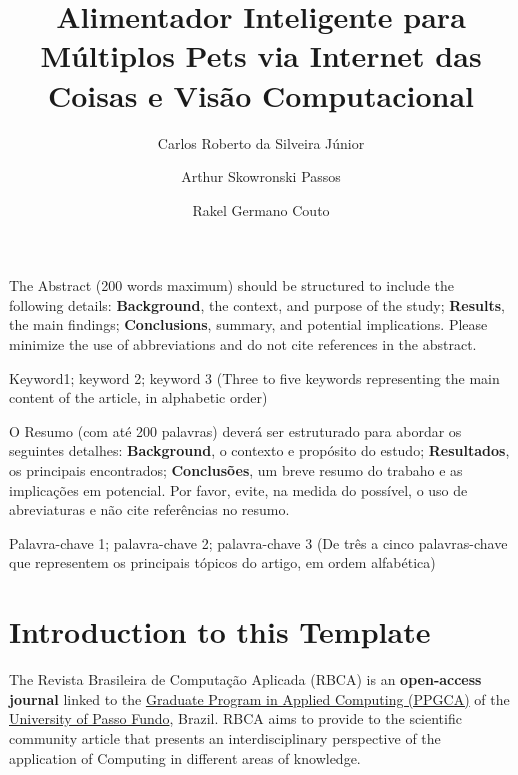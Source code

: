 \documentclass[alpha-refs,brazilian]{RBCA_v3.0}
\title{Alimentador Inteligente para Múltiplos Pets via Internet das Coisas e Visão Computacional}
\author[1]{Carlos Roberto da Silveira Júnior \orcid{0000-0000-0000-0000}}
\author[2]{Arthur Skowronski Passos \orcid{0000-0000-0000-0000}}
\author[2]{Rakel Germano Couto \orcid{0000-0000-0000-0000}}
\affil[1]{Instituto Federal de Educação, Ciência e Tecnologia de Goiás - Campus Goiânia, Brazil}
\begin{document}
\begin{frontmatter}
	
\maketitle
\thispagestyle{empty}

\begin{Abstract} %
The Abstract (200 words maximum) should be structured to include the following details: \textbf{Background}, the context, and purpose of the study; \textbf{Results}, the main findings; \textbf{Conclusions}, summary, and potential implications. Please minimize the use of abbreviations and do not cite references in the abstract.
\end{Abstract}

\begin{keywords}
Keyword1; keyword 2; keyword 3 (Three to five keywords representing the main content of the article, in alphabetic order)
\end{keywords}

\begin{resumo} %
	O Resumo (com até 200 palavras) deverá ser estruturado para abordar os seguintes detalhes: \textbf{Background}, o contexto e propósito do estudo; \textbf{Resultados}, os principais encontrados; \textbf{Conclusões}, um breve resumo do trabaho e as implicações em potencial. Por favor, evite, na medida do possível, o uso de abreviaturas e não cite referências no resumo.
\end{resumo}

\begin{palavras_chave} %
	Palavra-chave 1; palavra-chave 2; palavra-chave 3 (De três a cinco palavras-chave que representem os principais tópicos do artigo, em ordem alfabética)
\end{palavras_chave}

\end{frontmatter}


\section{Introduction to this Template}
The Revista Brasileira de Computação Aplicada (RBCA) is an \textbf{open-access journal} linked to the \href{http://ppgca.upf.br}{Graduate Program in Applied Computing (PPGCA)} of the \href{http://www.upf.br}{University of Passo Fundo}, Brazil. RBCA aims to provide to the scientific community article that presents an interdisciplinary perspective of the application of Computing in different areas of knowledge.
\end{document}
